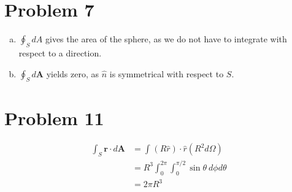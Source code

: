 \documentclass[10pt]{mypackage}
\begin{document}
\section{Problem 7}%
\begin{enumerate}[(a)]
  \item $\oint_{S}dA$ gives the area of the sphere, as we do not have to integrate with respect to a direction.
  \item $\oint_{S}d\mathbf{A}$ yields zero, as $\hat{n}$ is symmetrical with respect to $S$.
\end{enumerate}
\section{Problem 11}%
\begin{align*}
  \int_{S}^{} \mathbf{r}\cdot d\mathbf{A} &= \int_{}^{} \left(R\hat{r}\right)\cdot \hat{r}\left( R^2d\Omega\right)\\
                                          &= R^3\int_{0}^{2\pi}\int_{0}^{\pi/2}\sin\theta \:d\phi d\theta\\
                                          &= 2\pi R^3
\end{align*}
\end{document}
